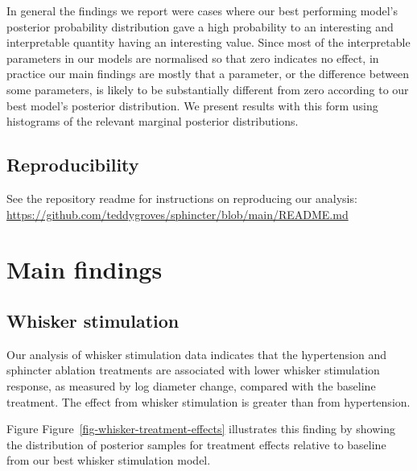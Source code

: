 \documentclass[
  letterpaper,
  DIV=11,
  numbers=noendperiod,
  oneside]{scrartcl}
\theoremstyle{plain}
\theoremstyle{remark}
\begin{document}
In general the findings we report were cases where our best performing
model's posterior probability distribution gave a high probability to an
interesting and interpretable quantity having an interesting value.
Since most of the interpretable parameters in our models are normalised
so that zero indicates no effect, in practice our main findings are
mostly that a parameter, or the difference between some parameters, is
likely to be substantially different from zero according to our best
model's posterior distribution. We present results with this form using
histograms of the relevant marginal posterior distributions.

\subsection{Reproducibility}\label{reproducibility}

See the repository readme for instructions on reproducing our analysis:
\url{https://github.com/teddygroves/sphincter/blob/main/README.md}

\section{Main findings}\label{main-findings}

\subsection{Whisker stimulation}\label{whisker-stimulation}

Our analysis of whisker stimulation data indicates that the hypertension
and sphincter ablation treatments are associated with lower whisker
stimulation response, as measured by log diameter change, compared with
the baseline treatment. The effect from whisker stimulation is greater
than from hypertension.

Figure Figure~\ref{fig-whisker-treatment-effects} illustrates this
finding by showing the distribution of posterior samples for treatment
effects relative to baseline from our best whisker stimulation model.
\end{document}
